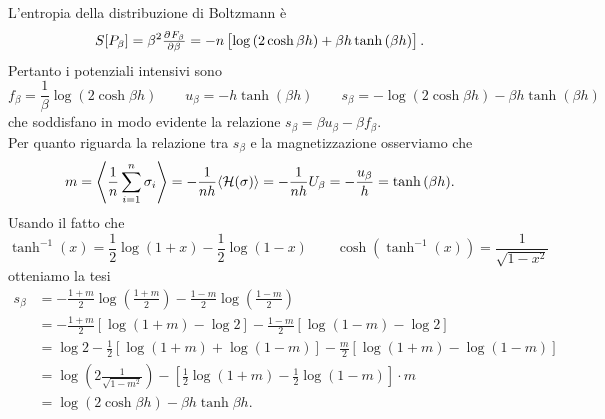 \begin{solution}
\[    \]
    L'entropia della distribuzione di Boltzmann è
    \[
        S[P_\beta] = \beta^2 \pd{F_\beta}{\beta} = -n \left[\log{(2 \cosh{\beta h})} + \beta h \tanh{(\beta h)}\right].
    \]
    Pertanto i potenziali intensivi sono
    \[
        f_\beta = \frac{1}{\beta} \log(2\cosh{\beta h}) \qquad u_\beta =  -h \tanh{(\beta h)} \qquad s_\beta = -\log{(2 \cosh{\beta h})} - \beta h \tanh{(\beta h)}
    \]
    che soddisfano in modo evidente la relazione $ s_\beta = \beta u_\beta - \beta f_\beta $. \\
    Per quanto riguarda la relazione tra $ s_\beta $ e la magnetizzazione osserviamo che
    \[
        m = \left\langle \frac{1}{n} \sum_{i=1}^{n} \sigma_i \right\rangle = -\frac{1}{nh} \langle \mathcal{H}(\sigma)\rangle = -\frac{1}{nh} U_\beta = - \frac{u_\beta}{h} = \tanh{(\beta h)}.
    \]
    Usando il fatto che
    \[
        \tanh^{-1}(x) = \frac{1}{2} \log(1+x) - \frac{1}{2} \log(1-x) \qquad \cosh(\tanh^{-1}(x)) = \frac{1}{\sqrt{1 - x^2}}
    \]
    otteniamo la tesi
    \begin{align*}
        s_\beta & = -\frac{1+m}{2}\log{\left(\frac{1+m}{2}\right)} -\frac{1-m}{2}\log{\left(\frac{1-m}{2}\right)} \\
        & = -\frac{1+m}{2}\left[\log{(1+m)} - \log{2}\right] -\frac{1-m}{2}\left[\log{(1-m)} - \log{2}\right] \\
        & = \log{2} - \frac{1}{2}\left[\log{(1+m)} + \log{(1-m)}\right] - \frac{m}{2}\left[\log{(1+m)} - \log{(1-m)}\right] \\
        & = \log{\left(2 \frac{1}{\sqrt{1-m^2}}\right)} - \left[\frac{1}{2}\log{(1+m)} - \frac{1}{2}\log{(1-m)}\right] \cdot m \\
        & = \log{\left(2 \cosh{\beta h}\right)} - \beta h \tanh{\beta h}.
    \end{align*}
\end{solution}

